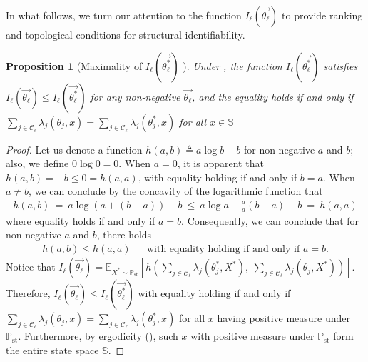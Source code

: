 \documentclass[pdflatex,sn-mathphys-num]{sn-jnl}%
\theoremstyle{thmstyleone}%
\newtheorem{proposition}[theorem]{Proposition}%
\theoremstyle{thmstyletwo}%
\theoremstyle{thmstylethree}%
\begin{document}
\begin{appendices}
In what follows, we turn our attention to the function $I_\ell\left(\overrightarrow{\theta_\ell}\right)$ to provide ranking and topological conditions for structural identifiability.

\begin{proposition}[Maximality of $I_\ell\left(\overrightarrow{\theta^*_\ell}\right)$ ]\label{proposition maximality of I}
    Under , the function $I_\ell\left(\overrightarrow{\theta^*_\ell}\right)$ satisfies $I_\ell\left(\overrightarrow{\theta_\ell}\right)\leq I_\ell\left(\overrightarrow{\theta^*_\ell}\right)$ for any non-negative $\overrightarrow{\theta_\ell}$, and the equality holds if and only if $\sum_{j\in\mathcal C_\ell} \lambda_{j}(\theta_j,x) = \sum_{j\in\mathcal C_\ell} \lambda_{j}(\theta^*_j,x)$ for all $x\in\mathbb S$
\end{proposition}

\begin{proof}
    Let us denote a function $h(a,b) \triangleq  a \log b - b$ for non-negative $a$ and $b$; also, we define $0\log0=0$. 
    When $a=0$, it is apparent that $h(a,b) = -b \leq 0 =h(a,a)$, with equality holding if and only if  $b=a$.
    When $a\neq b$, we can conclude by the concavity of the logarithmic function that
    \begin{align*}
        h(a,b) ~=~ a \log(a +(b-a)) - b 
        ~\leq~ a \log a  + \frac{a}{a} (b-a) - b
        ~=~ h(a,a)
    \end{align*}
    where equality holds if and only if $a=b$.
    Consequently, we can conclude that for non-negative $a$ and $b$, there holds
    \begin{align*}
        h(a,b) \leq h(a,a)
        && \text{with equality holding if and only if $a=b$.}
    \end{align*}
    Notice that $I_{\ell}\left(\overrightarrow{\theta_\ell}\right)
        = 
        \mathbb E_{X^*\sim \mathbb P_\text{st}}\left[
            h\left(\sum_{j\in\mathcal C_\ell}
            \lambda_{j}(\theta^*_j,X^*),~ 
            \sum_{j\in\mathcal C_\ell}
            \lambda_{j}(\theta_j,X^*)
            \right)
        \right]$.
    Therefore, $I_\ell\left(\overrightarrow{\theta_\ell}\right)\leq I_\ell\left(\overrightarrow{\theta^*_\ell}\right)$ with equality holding if and only if $\sum_{j\in\mathcal C_\ell} \lambda_{j}(\theta_j,x) = \sum_{j\in\mathcal C_\ell} \lambda_{j}(\theta^*_j,x)$ for all $x$ having positive measure under $\mathbb P_\text{st}$.
    Furthermore, by ergodicity (), such $x$ with positive measure under $\mathbb P_\text{st}$ form the entire state space $\mathbb S$.
\end{proof}




\end{appendices}
\end{document}
